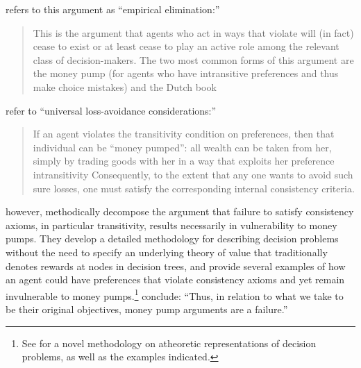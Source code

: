 \documentclass[../main.tex]{subfiles}
\begin{document}
\textcite[402-403]{Hands2014} refers to this argument as \enquote{empirical elimination:}

\singlespacing
\blockquote{
This is the argument that agents who act in ways that violate  will (in fact) cease to exist or at least cease to play an active role among the relevant class of decision-makers.
The two most common forms of this argument are the money pump (for agents who have intransitive preferences and thus make choice mistakes) and the Dutch book\textelp{}
}

\doublespacing
\noindent \textcite[336]{Grune-Yanoff2014} refer to \enquote{universal loss-avoidance considerations:}

\singlespacing
\blockquote{
If an agent violates the transitivity condition on preferences, then that individual can be \enquote{money pumped}:
all wealth can be taken from her, simply by trading goods with her in a way that exploits her preference intransitivity\textelp{}
Consequently, to the extent that any one wants to avoid such sure losses, one must satisfy the corresponding internal consistency criteria.
}
\doublespacing

\textcite{Cubitt2001} however, methodically decompose the argument that failure to satisfy consistency axioms, in particular transitivity, results necessarily in vulnerability to money pumps.
They develop a detailed methodology for describing decision problems without the need to specify an underlying theory of value that traditionally denotes rewards at nodes in decision trees, and provide several examples of how an agent could have preferences that violate consistency axioms and yet remain invulnerable to money pumps.\footnote{
	See \textcite{Cubitt2001} for a novel methodology on atheoretic representations of decision problems, as well as the examples indicated.
}
\textcite[154]{Cubitt2001} conclude: \enquote{Thus, in relation to what we take to be their original objectives, money pump arguments are a failure.}
\end{document}
